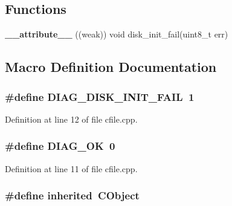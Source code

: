 \subsection*{Functions}
\begin{DoxyCompactItemize}
\item 
{\bf \+\_\+\+\_\+attribute\+\_\+\+\_\+} ((weak)) void disk\+\_\+init\+\_\+fail(uint8\+\_\+t err)
\end{DoxyCompactItemize}


\subsection{Macro Definition Documentation}
\subsubsection[{D\+I\+A\+G\+\_\+\+D\+I\+S\+K\+\_\+\+I\+N\+I\+T\+\_\+\+F\+A\+IL}]{\setlength{\rightskip}{0pt plus 5cm}\#define D\+I\+A\+G\+\_\+\+D\+I\+S\+K\+\_\+\+I\+N\+I\+T\+\_\+\+F\+A\+IL~1}\label{cfile_8cpp_a5f5548e3ed623d35937530cbf51bff93}


Definition at line 12 of file cfile.\+cpp.

\subsubsection[{D\+I\+A\+G\+\_\+\+OK}]{\setlength{\rightskip}{0pt plus 5cm}\#define D\+I\+A\+G\+\_\+\+OK~0}\label{cfile_8cpp_ae283178a6a32f9874ad70c3c07b67fcf}


Definition at line 11 of file cfile.\+cpp.

\subsubsection[{inherited}]{\setlength{\rightskip}{0pt plus 5cm}\#define inherited~C\+Object}\label{cfile_8cpp_a3920e3b7cb0909b941b2409493acf8f1}


